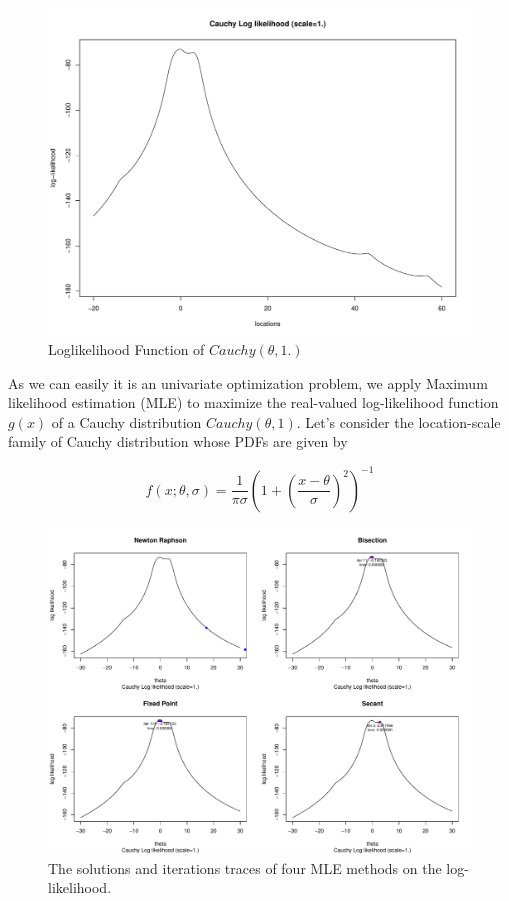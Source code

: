 \begin{figure}[h!]
\includegraphics[scale=0.3]{figs/cauchy-loglik-1d.pdf}
\caption{Loglikelihood Function of $Cauchy(\theta, 1.)$}
\label{img:cauchy-loglik-1d}
\end{figure}

As we can easily it is an univariate optimization problem, we apply Maximum likelihood estimation (MLE) to maximize the real-valued log-likelihood function $g(x)$ of a Cauchy distribution $Cauchy(\theta, 1)$. Let's consider the location-scale family of Cauchy distribution whose PDFs are given by

$$f(x;\theta, \sigma) = \frac{1}{\pi \sigma} (1 + (\frac{x-\theta}{\sigma})^2)^{-1}$$

\begin{figure}[h!]
\includegraphics[scale=0.3]{figs/cauchy-sol-on-loglik-4figs.pdf}
\caption{The solutions and iterations traces of four MLE methods on the log-likelihood.}
\label{img:cauchy-sol-on-loglik-4figs}
\end{figure}

